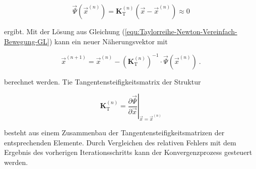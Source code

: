 	\begin{equation}\label{equ:Taylorreihe-Newton-Vereinfach-Bewegung-GL}
	\vec{\varPsi}(\vec{x}^{(n)}) = \mathbf{K}_{\text{T}}^{(n)} (\vec{x}-\vec{x}^{(n)})\approx 0
	\end{equation}
	
	ergibt. Mit der Lösung aus Gleichung (\ref{equ:Taylorreihe-Newton-Vereinfach-Bewegung-GL}) kann ein neuer Näherungsvektor mit
	
	\begin{equation}\label{equ:Naeherungswert-x(n+1)}
	\vec{x}^{(n+1)} = \vec{x}^{(n)} - \left( \mathbf{K}_{\text{T}}^{(n)} \right)^{-1} \cdot \vec{\varPsi}(\vec{x}^{(n)}) \ .
	\end{equation}
	
	 berechnet werden. Tie Tangentensteifigkeitsmatrix der Struktur
	
	\begin{equation}\label{equ:Taylorreihe-K}
	\mathbf{K}_{\text{T}}^{(n)} = \left. \dfrac{\partial \vec{\varPsi}}{\partial \vec{x}}\right| _{\vec{x}=\vec{x}^{(n)}}
	\end{equation}
	
	 besteht aus einem Zusammenbau der Tangentensteifigkeitsmatrizen der entsprechenden Elemente. Durch Vergleichen des relativen Fehlers mit dem Ergebnis des vorherigen Iterationsschritts kann der Konvergenzprozess gesteuert werden.\\
	 
